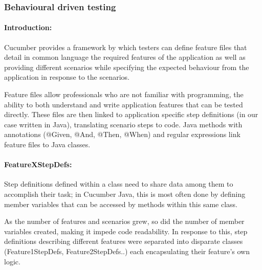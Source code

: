 \subsubsection{Behavioural driven testing}

\paragraph{Introduction:}
Cucumber provides a framework by which testers can define feature files that detail in common language the required features of the application as well as providing different scenarios while specifying the expected behaviour from the application in response to the scenarios. 
\par 
Feature files allow professionals who are not familiar with programming, the ability to both understand and write application features that can be tested directly. 
These files are then linked to application specific step definitions (in our case written in Java), translating scenario steps to code. Java methods with annotations (@Given, @And, @Then, @When) and regular expressions link feature files to Java classes.  
\paragraph{FeatureXStepDefs:}
Step definitions defined within a class need to share data among them to accomplish their task; in Cucumber Java, this is most often done by defining member variables that can be accessed by methods within this same class.  
\par 
As the number of features and scenarios grew, so did the number of member variables created, making it impede code readability. In response to this, step definitions describing different features were separated into disparate classes (Feature1StepDefs, Feature2StepDefs..) each encapsulating their feature's own logic.  
\par 
